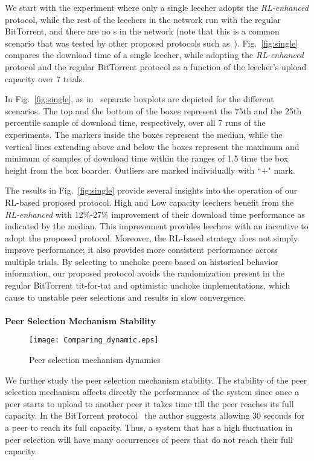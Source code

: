 We start with the experiment where only a single leecher adopts the 
\emph{RL-enhanced} protocol, while the rest of the leechers in the network run with 
the regular BitTorrent, and there are no \FR s in the network (note that this 
is a common scenario that was tested by other proposed protocols such 
as~\cite{levin08, piatek07}). 
Fig.~\ref{fig:single} compares the download time of a single 
leecher, while adopting the \emph{RL-enhanced} protocol and the regular BitTorrent 
protocol as a function of the leecher's upload capacity over 7 trials.

In Fig.~\ref{fig:single}, as in~\cite{mcgill78} separate boxplots are depicted 
for the different scenarios. The top and the bottom of the boxes represent the 
75th and the 25th percentile sample of download time, respectively, over all 7 
runs of the experiments. The markers inside the boxes represent the median, 
while the vertical lines extending above and below the boxes represent the 
maximum and minimum of samples of download time within the ranges of 1.5 time 
the box height from the box boarder. Outliers are marked individually with 
``$+$" mark.

The results in Fig.~\ref{fig:single} provide several insights into the 
operation of our RL-based proposed protocol.
High and Low capacity leechers benefit from the \emph{RL-enhanced} with 12\%-27\%
improvement of their download time performance as indicated by the median.
This improvement provides leechers with an incentive to adopt the proposed 
protocol. Moreover, the RL-based strategy does not simply improve 
performance; it also provides more consistent performance across multiple 
trials. By selecting to unchoke peers based on historical behavior information, 
our proposed protocol avoids the randomization present in the regular BitTorrent 
tit-for-tat and optimistic unchoke implementations, which cause to unstable 
peer selections and results in slow convergence.\\
\\{\bfseries Peer Selection Mechanism Stability}
\begin{figure}[t]
\centering
\texttt{[image: Comparing\_dynamic.eps]}
\caption{Peer selection mechanism dynamics} 
\label{fig:dynamics}
\end{figure}
We further study the peer selection mechanism stability.
The stability of the peer selection mechanism affects directly the performance 
of the system since once a peer starts to upload to another peer it takes time 
till the peer reaches its full capacity. In the BitTorrent 
protocol~\cite{cohen03} the author suggests allowing 30 seconds for a peer to 
reach its full capacity. 
Thus, a system that has a high fluctuation in peer selection will have many 
occurrences of peers that do not reach their full capacity.

